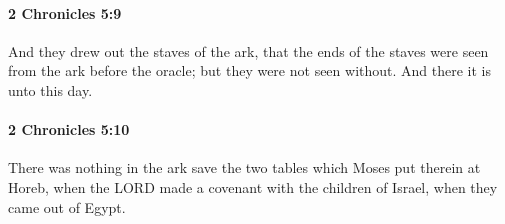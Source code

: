 		\paragraph{2 Chronicles 5:9} %
			\label{2CHRONICLES-5-9}

			And they drew out the staves of the ark, that the ends of the staves were seen from the ark before the oracle; but they were not seen without. And there it is unto this day.


		\paragraph{2 Chronicles 5:10} %
			\label{2CHRONICLES-5-10}

			There was nothing in the ark save the two tables which Moses put therein at Horeb, when the LORD made a covenant with the children of Israel, when they came out of Egypt.


